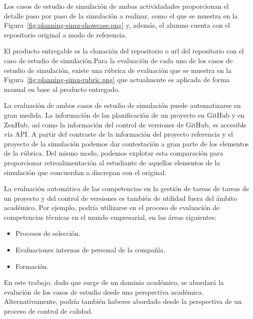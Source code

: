 Los casos de estudio de simulación de ambas actividadades proporcionan el  detalle paso por paso de la simulación a realizar, como el que se muestra en la Figura~\ref{fig:planning-simu-showcase.png} y, además, el alumno cuenta con el repositorio original a modo de referencia. 


El producto entregable es la clonación del repositorio o url del repositorio con el caso de estudio de simulación.Para la evaluación de cada uno de los casos de estudio de simulación, existe una rúbrica de evaluación que se muestra en la  Figura~\ref{fig:planning-simu-rubric.png} que actualmente es aplicada de forma manual en base al producto entregado.


La evaluación de ambos casos de estudio de simulación puede automatizarse en gran medida. La información de las planificación de un proyecto en GitHub y en ZenHub, así como la información  del control de versiones de GitHub, es accesible vía API. A partir del contraste de la información del proyecto referencia y el proyecto de la simulación podemos dar contestación a gran parte de los elementos de la rúbrica. Del mismo modo, podemos explotar esta comparación para proporcionar retroalimentación al estudiante de aquellos elementos de la simulación que concuerdan o discrepan con el original.

La evaluación  automática de las competencias en la  gestión de tareas de tareas de un proyecto y del control de versiones es también de  utilidad fuera del ámbito académico. Por ejemplo, podría utilizarse en el proceso de evaluación de competencias técnicas en el mundo empresarial, en las áreas siguientes:

\begin{itemize}
	\item Procesos de selección.
	\item Evaluaciones internas de personal de la compañía.
	\item Formación.
\end{itemize}

En este trabajo, dado que surge de un dominio académico, se abordará la evalución de los casos de estudio desde una perspectiva académica.  Alternativamente, podría también haberse abordado desde la perspectiva de un proceso de control de calidad.